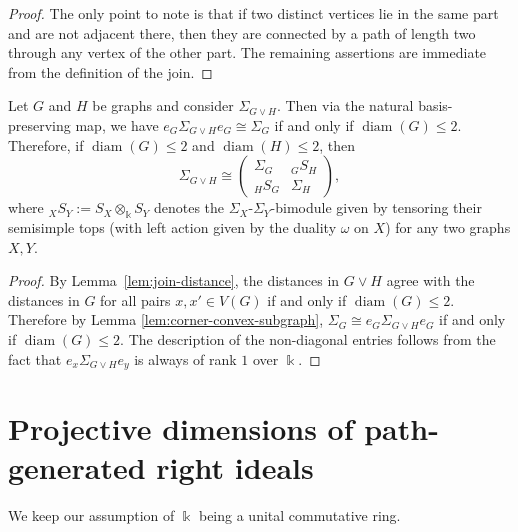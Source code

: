 \documentclass[a4paper,leqno]{amsart}
\begin{document}
\begin{proof}
The only point to note is that if two distinct vertices lie in the same
part and are not adjacent there, then they are connected by a path of
length two through any vertex of the other part. The remaining assertions are immediate from the definition of the join.
\end{proof}

\begin{prop}\label{prop:join-matrix}
Let $G$ and $H$ be graphs and consider $\Sigma_{G\vee H}$.
Then via the natural basis-preserving map, we have
$e_G\Sigma_{G\vee H}e_G\cong \Sigma_G$ if and only if $\operatorname{diam}(G)\leq 2$. Therefore, if $\operatorname{diam}(G)\leq 2$ and $\operatorname{diam}(H)\leq 2$, then
\[\Sigma_{G\vee H}\cong\begin{pmatrix}
\Sigma_G & {}_GS_H\\
{}_HS_G &\Sigma_H
\end{pmatrix},\]
where ${}_XS_Y:= S_X\otimes_{\Bbbk} S_Y$ denotes the $\Sigma_X$-$\Sigma_Y$-bimodule given by tensoring their semisimple tops (with left action given by the duality $\omega$ on $X$) for any two graphs $X,Y$.
\end{prop}

\begin{proof}
By Lemma~\ref{lem:join-distance}, the distances in $G\vee H$ agree with the distances in $G$ for all pairs $x,x'\in V(G)$ if and only if $\operatorname{diam}(G)\leq 2$.
Therefore by Lemma \ref{lem:corner-convex-subgraph}, $\Sigma_G\cong e_G\Sigma_{G\vee H}e_G$ if and only if $\operatorname{diam}(G)\leq 2$.
The description of the non-diagonal entries follows from the fact that $e_x \Sigma_{G\vee H} e_y$ is always of rank $1$ over $\Bbbk$.
\end{proof}



\section{Projective dimensions of path-generated right ideals}\label{sec:4-proj-dim}


We keep our assumption of $\Bbbk$ being a unital commutative ring.
\end{document}

